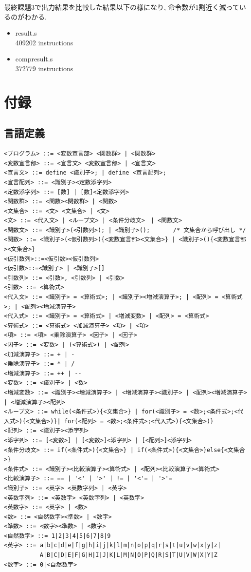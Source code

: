 \documentclass[a4j]{jarticle}
\begin{document}
最終課題3で出力結果を比較した結果以下の様になり, 命令数が1割近く減っているのがわかる.

\begin{itemize}
\item result.s\\
409202 instructions
\item compresult.s\\
372779 instructions
\end{itemize} 

\section{付録}

\subsection{言語定義}
\begin{verbatim}
<プログラム> ::= <変数宣言部> <関数群> | <関数群>
<変数宣言部> ::= <宣言文> <変数宣言部> | <宣言文>
<宣言文> ::= define <識別子>; | define <宣言配列>;
<宣言配列> ::= <識別子><定数添字列>
<定数添字列> ::= [数] | [数]<定数添字列>
<関数群> ::= <関数><関数群> | <関数>
<文集合> ::= <文> <文集合> | <文>
<文> ::= <代入文> | <ループ文> | <条件分岐文>　| <関数文> 
<関数文> ::= <識別子>(<引数列>); | <識別子>();　　　　/* 文集合から呼び出し */
<関数> ::= <識別子>(<仮引数列>){<変数宣言部><文集合>} | <識別子>(){<変数宣言部><文集合>}
<仮引数列>::=<仮引数><仮引数列>
<仮引数>::=<識別子> | <識別子>[]
<引数列> ::= <引数>, <引数列> | <引数>
<引数> ::= <算術式>
<代入文> ::= <識別子> = <算術式>; | <識別子><増減演算子>; | <配列> = <算術式>; | <配列><増減演算子>
<代入式> ::= <識別子> = <算術式> | <増減変数> | <配列> = <算術式>
<算術式> ::= <算術式> <加減演算子> <項> | <項> 
<項> ::= <項> <乗除演算子> <因子> | <因子>
<因子> ::= <変数> | (<算術式>) | <配列>
<加減演算子> ::= + | -
<乗除演算子> ::= * | /
<増減演算子> ::= ++ | --
<変数> ::= <識別子> | <数>
<増減変数> ::= <識別子><増減演算子> | <増減演算子><識別子> | <配列><増減演算子> | <増減演算子><配列>
<ループ文> ::= while(<条件式>){<文集合>} | for(<識別子> = <数>;<条件式>;<代入式>){<文集合>)}| for(<配列> = <数>;<条件式>;<代入式>){<文集合>)}
<配列> ::= <識別子><添字列> 
<添字列> ::= [<変数>] | [<変数>]<添字列> | [<配列>]<添字列>
<条件分岐文> ::= if(<条件式>){<文集合>} | if(<条件式>){<文集合>}else{<文集合>}
<条件式> ::= <識別子><比較演算子><算術式> | <配列><比較演算子><算術式>
<比較演算子> ::= == | '<' | '>' | != | '<'= | '>'=
<識別子> ::= <英字> <英数字列> | <英字>
<英数字列> ::= <英数字> <英数字列> | <英数字>
<英数字> ::= <英字> | <数>
<数> ::= <自然数字><準数> | <数字>
<準数> ::= <数字><準数> | <数字>
<自然数字> ::= 1|2|3|4|5|6|7|8|9
<英字> ::= a|b|c|d|e|f|g|h|i|j|k|l|m|n|o|p|q|r|s|t|u|v|w|x|y|z|
　　　　　  A|B|C|D|E|F|G|H|I|J|K|L|M|N|O|P|Q|R|S|T|U|V|W|X|Y|Z
<数字> ::= 0|<自然数字>
\end{verbatim}
\end{document}
